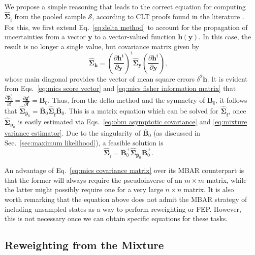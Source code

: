 \documentclass[
    journal=jctcce,
    layout=twocolumn
]{achemso}
\newcommand{\mt}[1]{\boldsymbol{\mathbf{#1}}}   %
\newcommand{\vt}[1]{\boldsymbol{\mathbf{#1}}}   %
\newcommand{\tr}[1]{#1^\text{t}}                %
\newcommand{\diff}[2]{\frac{\partial #2}{\partial #1}} %
\newcommand{\avg}[1]{\overline{#1}}             %
\begin{document}
We propose a simple reasoning that leads to the correct equation for computing $ \hat{\mt \Sigma}_{\hat{\vt f}}$ from the pooled sample $\mathcal S$, according to CLT proofs found in the literature \cite{Geyer_1994, Buta_2010, Buta_2011, Doss_2014}. For this, we first extend Eq.~\eqref{eq:delta method} to account for the propagation of uncertainties from a vector $\vt y$ to a vector-valued function $\vt h({\vt y})$. In this case, the result is no longer a single value, but covariance matrix given by
\begin{equation*}
\label{eq:vectorial delta method}
\hat{\mt \Sigma}_{\vt h} = \tr{\left( \diff{\vt y}{\tr{\vt h}} \right)} \hat{\mt \Sigma}_{\vt y} \left(\diff{\vt y}{\tr{\vt h}} \right),
\end{equation*}
whose main diagonal provides the vector of mean square errors $\delta^2 \vt h$. It is evident from Eqs.~\eqref{eq:mics score vector} and \eqref{eq:mics fisher information matrix} that $\diff{\vt f}{\tr{\avg{\vt p}}_0} = \diff{\vt f}{\tr{\vt g}} = \avg{\mt B}_0$. Thus, from the delta method and the symmetry of $\avg{\mt B}_0$, it follows that $\hat{\mt \Sigma}_{\avg{\vt p}_0} = \avg{\mt B}_0 \hat{\mt \Sigma}_{\hat{\vt f}} \avg{\mt B}_0$. This is a matrix equation which can be solved for $\hat{\mt \Sigma}_{\hat{\vt f}}$, once $\hat{\mt \Sigma}_{\avg{\vt p}_0}$ is easily estimated via Eqs.~\eqref{eq:obm asymptotic covariance} and \eqref{eq:mixture variance estimator}. Due to the singularity of $\avg{\mt B}_0$ (as discussed in Sec.~\ref{sec:maximum likelihood}), a feasible solution is
\begin{equation}
\label{eq:mics covariance matrix}
\hat{\mt \Sigma}_{\hat{\vt f}} = \avg{\mt B}_0^+  \hat{\mt \Sigma}_{\avg{\vt p}_0} \avg{\mt B}_0^+.
\end{equation}

An advantage of Eq.~\eqref{eq:mics covariance matrix} over its MBAR counterpart is that the former will always require the pseudoinverse of an $m \times m$ matrix, while the latter might possibly require one for a very large $n \times n$ matrix. It is also worth remarking that the equation above does not admit the MBAR strategy of including unsampled states as a way to perform reweighting or FEP. However, this is not necessary once we can obtain specific equations for these tasks.

\subsection{Reweighting from the Mixture}
\label{sec:mics reweighting}
\end{document}

